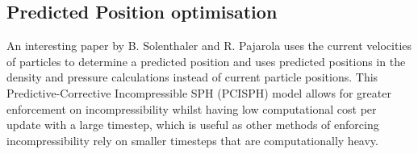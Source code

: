 \documentclass[write-up.tex]{subfiles}
\begin{document}
\subsection{Predicted Position optimisation}
An interesting paper by B. Solenthaler and R. Pajarola \cite{solenthaler} uses the current velocities of particles to determine a predicted position and uses predicted positions in the density and pressure calculations instead of current particle positions. This Predictive-Corrective Incompressible SPH (PCISPH) model allows for greater enforcement on incompressibility whilst having low computational cost per update with a large timestep, which is useful as other methods of enforcing incompressibility rely on smaller timesteps that are computationally heavy.
\end{document}
